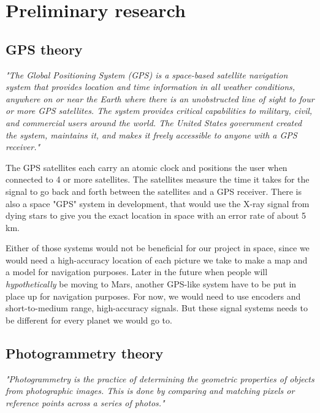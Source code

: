 \clearpage
\section{Preliminary research}

\subsection{GPS theory}

\textit{"The Global Positioning System (GPS) is a space-based satellite navigation system that provides location and time information in all weather conditions, anywhere on or near the Earth where there is an unobstructed line of sight to four or more GPS satellites. The system provides critical capabilities to military, civil, and commercial users around the world. The United States government created the system, maintains it, and makes it freely accessible to anyone with a GPS receiver."\cite{GPS1}}

The GPS satellites each carry an atomic clock and positions the user when connected to 4 or more satellites. The satellites measure the time it takes for the signal to go back and forth between the satellites and a GPS receiver\cite{GPS1}. There is also a space "GPS" system in development, that would use the X-ray signal from dying stars to give you the exact location in space with an error rate of about 5 km\cite{GPS2}.

Either of those systems would not be beneficial for our project in space, since we would need a high-accuracy location of each picture we take to make a map and a model for navigation purposes. Later in the future when people will \textit{hypothetically} be moving to Mars, another GPS-like system have to be put in place up for navigation purposes. For now, we would need to use encoders and short-to-medium range, high-accuracy signals. But these signal systems needs to be different for every planet we would go to. 

\subsection{Photogrammetry theory}

\textit{"Photogrammetry is the practice of determining the geometric properties of objects from
	photographic images. This is done by comparing and matching pixels or reference points across a series
	of photos."\cite{Photogrammetry}}


